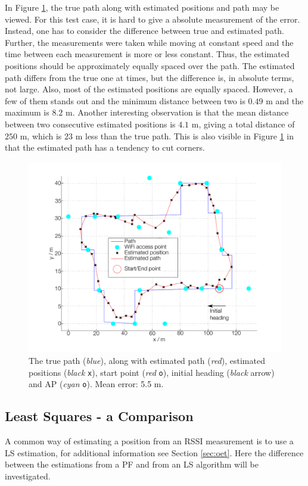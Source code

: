 \documentclass{LTHthesis}
\begin{document}
In Figure \ref{true_vs_est_env_3}, the true path along with estimated positions and path may be viewed. For this test case, it is hard to give a absolute measurement of the error. Instead, one has to consider the difference between true and estimated path. Further, the measurements were taken while moving at constant speed and the time between each measurement is more or less constant. Thus, the estimated positions should be approximately equally spaced over the path. The estimated path differs from the true one at times, but the difference is, in absolute terms, not large. Also, most of the estimated positions are equally spaced. However, a few of them stands out and the minimum distance between two is $0.49$ m and the maximum is $8.2$ m. Another interesting observation is that the mean distance between two consecutive estimated positions is $4.1$ m, giving a total distance of $250$ m, which is $23$ m less than the true path. This is also visible in Figure \ref{true_vs_est_env_3} in that the estimated path has a tendency to cut corners.         
%
\begin{figure}[!hbt]

\includegraphics[width=1\textwidth ]{images/pure_rssi/true_vs_est_env_3}
\caption{The true path (\emph{blue}), along with estimated path (\emph{red}), estimated positions (\emph{black} \texttt{x}), start point (\emph{red} \texttt{o}), initial heading (\emph{black} arrow) and AP (\emph{cyan} \texttt{o}). Mean error: 5.5 m.}\label{true_vs_est_env_3}
\end{figure}
%
\subsection{Least Squares - a Comparison}
%
A common way of estimating a position from an RSSI measurement is to use a LS estimation, for additional information see Section \ref{sec:oet}. Here the difference between the estimations from a PF and from an LS algorithm will be investigated. 
\end{document}
